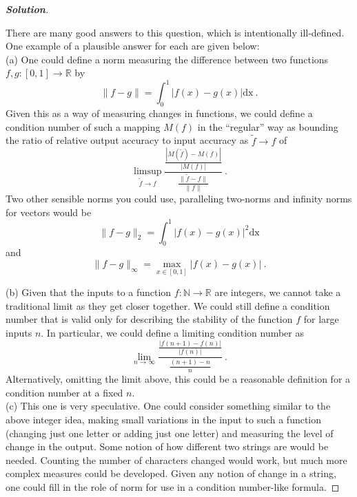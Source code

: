 \documentclass[11pt]{article}
\newenvironment{solution}{%
  \begin{proof}[\textbf{Solution}]$ $\par\nobreak\ignorespaces
}{%
  \end{proof}
}
\theoremstyle{definition}
\begin{document}
\begin{solution}
There are many good answers to this question, which is intentionally ill-defined. One example of a plausible answer for each are given below:\\

\noindent (a) One could define a norm measuring the difference between two functions $f,g\colon [0,1]\rightarrow \mathbb{R}$ by
$$ \|f-g\| = \int_0^1 |f(x)-g(x)| \mathrm{dx} \ . $$
Given this as a way of measuring changes in functions, we could define a condition number of such a mapping $M(f)$ in the ``regular'' way as bounding the ratio of relative output accuracy to input accuracy as $\tilde f \rightarrow f$ of
$$ \limsup_{\tilde f \rightarrow f} \frac{\frac{|M(\tilde f) - M(f)|}{|M(f)|}}{\frac{\|\tilde f - f\|}{\|f\|}} \ . $$
Two other sensible norms you could use, paralleling two-norms and infinity norms for vectors would be
$$ \|f-g\|_2 = \int_0^1 |f(x)-g(x)|^2 \mathrm{dx}$$
and
$$ \|f-g\|_\infty = \max_{x\in [0,1]} |f(x)-g(x)| \ . $$

\noindent (b) Given that the inputs to a function $f\colon \mathbb{N} \rightarrow \mathbb{R}$ are integers, we cannot take a traditional limit as they get closer together. We could still define a condition number that is valid only for describing the stability of the function $f$ for large inputs $n$. In particular, we could define a limiting condition number as
$$ \lim_{n\rightarrow \infty} \frac{\frac{|f(n+1)-f(n)|}{|f(n)|}}{\frac{(n+1) - n}{n}} \ . $$
Alternatively, omitting the limit above, this could be a reasonable definition for a condition number at a fixed $n$.\\

\noindent (c) This one is very speculative. One could consider something similar to the above integer idea, making small variations in the input to such a function (changing just one letter or adding just one letter) and measuring the level of change in the output. Some notion of how different two strings are would be needed. Counting the number of characters changed would work, but much more complex measures could be developed. Given any notion of change in a string, one could fill in the role of norm for use in a condition number-like formula.
\end{solution}
\end{document}

